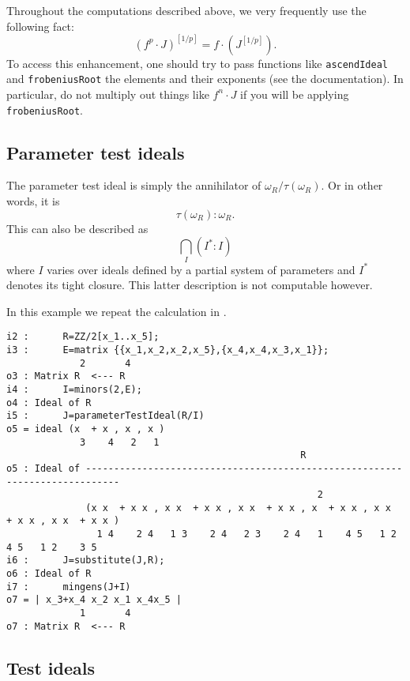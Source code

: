 \documentclass[11pt]{amsart}
\begin{document}
\begin{remark}
Throughout the computations described above, we very frequently use the following fact:
\[
(f^p \cdot J)^{[1/p]} = f \cdot (J^{[1/p]}).
\]
To access this enhancement, one should try to pass functions like {\tt ascendIdeal} and {\tt frobeniusRoot} the elements and their exponents (see the documentation).  In particular, do not multiply out things like $f^n \cdot J$ if you will be applying {\tt frobeniusRoot}.
\end{remark}

\subsection{Parameter test ideals}

The parameter test ideal is simply the annihilator of $\omega_R/\tau(\omega_R)$.  Or in other words, it is
\[
\tau(\omega_R) : \omega_R.
\]
This can also be described as
\[
\bigcap_{I} (I^* : I)
\]
where $I$ varies over ideals defined by a partial system of parameters and $I^*$ denotes its tight closure.  This latter description is not computable however.

\begin{example}\label{Example: parameter test ideal}
In this example we repeat the calculation in \cite[\S 9]{KatzmanParameterTestIdealOfCMRings}.

\begin{verbatim}
i2 :      R=ZZ/2[x_1..x_5]; 
i3 :      E=matrix {{x_1,x_2,x_2,x_5},{x_4,x_4,x_3,x_1}};
             2       4
o3 : Matrix R  <--- R
i4 :      I=minors(2,E);
o4 : Ideal of R
i5 :      J=parameterTestIdeal(R/I)
o5 = ideal (x  + x , x , x )
             3    4   2   1
                                                    R
o5 : Ideal of ----------------------------------------------------------------------------
                                                       2
              (x x  + x x , x x  + x x , x x  + x x , x  + x x , x x  + x x , x x  + x x )
                1 4    2 4   1 3    2 4   2 3    2 4   1    4 5   1 2    4 5   1 2    3 5
i6 :      J=substitute(J,R);
o6 : Ideal of R
i7 :      mingens(J+I)
o7 = | x_3+x_4 x_2 x_1 x_4x_5 |
             1       4
o7 : Matrix R  <--- R
\end{verbatim}

\end{example}

\subsection{Test ideals}
\end{document}
